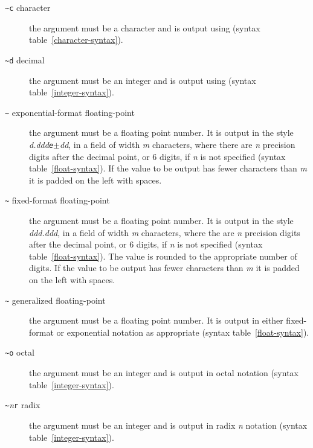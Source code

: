 \begin{optDefinition}
\begin{description}
    \item[{\tt\textasciitilde c} character]%
    the argument must be a character and is output using 
    (syntax table~\ref{character-syntax}).

    \item[{\tt\textasciitilde d} decimal]%
    the argument must be an integer and is output using 
    (syntax table~\ref{integer-syntax}).

    \item[{\tt\textasciitilde}
    exponential-format floating-point]%
    the argument must be a floating point number.  It is output in the style
    \mbox{\em\optional{-}d.ddd{\tt{e}}$\pm$dd}, in a field of width {\em m\/}
    characters, where there are {\em n\/} precision digits after the decimal
    point, or 6 digits, if {\em n\/} is not specified (syntax
    table~\ref{float-syntax}).  If the value to be output has fewer characters
    than {\em m\/} it is padded on the left with spaces.

    \item[{\tt\textasciitilde}
    fixed-format floating-point]%
    the argument must be a floating point number.  It is output in the style
    \mbox{\em\optional{-}ddd.ddd}, in a field of width {\em m\/} characters,
    where the are {\em n\/} precision digits after the decimal point, or 6
    digits, if {\em n\/} is not specified (syntax table~\ref{float-syntax}).
    The value is rounded to the appropriate number of digits.  If the value to
    be output has fewer characters than {\em m\/} it is padded on the left with
    spaces.

    \item[{\tt\textasciitilde}
    generalized floating-point]%
    the argument must be a floating point number.  It is output in either
    fixed-format or exponential notation as appropriate
    (syntax table~\ref{float-syntax}).

    \item[{\tt\textasciitilde o} octal]%
    the argument must be an integer and is output in octal notation
    (syntax table~\ref{integer-syntax}).

    \item[{\tt\textasciitilde}{\em n}{\tt r} radix]%
    the argument must be an integer and is output in radix {\em n\/} notation
    (syntax table~\ref{integer-syntax}).


\end{description}
\end{optDefinition}
